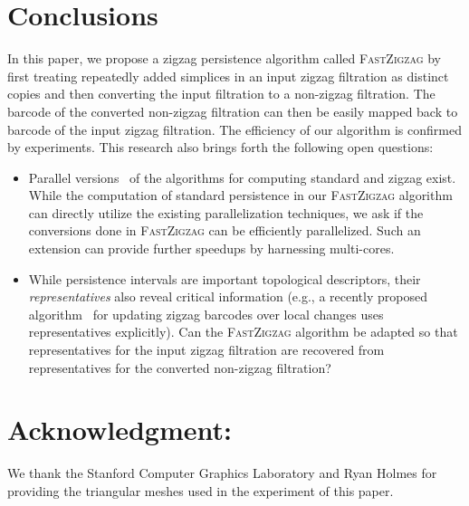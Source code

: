 \documentclass[letterpaper,11pt]{article}
\theoremstyle{mythmstyle}
\theoremstyle{mydefstyle}
\theoremstyle{plain}
\theoremstyle{definition}
\newcommand{\<}[1]{\langle #1\rangle}
\begin{document}
\section{Conclusions}

In this paper, we propose a zigzag persistence algorithm 
called \textsc{FastZigzag}
by first treating repeatedly added simplices in an input zigzag filtration
as distinct copies and then converting the input filtration
to a non-zigzag filtration.
The barcode of the converted non-zigzag filtration can then be
easily mapped back to barcode of the input zigzag filtration. 
The efficiency of our algorithm is confirmed by experiments.
This research also brings forth the following open questions:
\begin{itemize}
    \item Parallel versions~\cite{carlsson2019persistent,zhang2020gpu} of the algorithms for computing 
    standard and zigzag exist.
    While the computation of standard persistence in our \textsc{FastZigzag} algorithm 
    can directly utilize the existing parallelization techniques, we ask
    if the conversions done in \textsc{FastZigzag} can be efficiently parallelized.
    Such an extension can provide further speedups by harnessing multi-cores.
    
    \item While persistence intervals are important topological descriptors,
    their \emph{representatives} also reveal critical information
    (e.g., a recently proposed algorithm~\cite{dey2021updating} for updating
    zigzag barcodes over local changes uses
    representatives explicitly).
    Can the \textsc{FastZigzag} algorithm be adapted so that representatives
    for the input zigzag filtration are recovered from representatives 
    for the converted non-zigzag filtration?
\end{itemize}

\section*{Acknowledgment:}
We thank the Stanford Computer Graphics Laboratory
and Ryan Holmes
for providing the triangular meshes used in the experiment
of this paper.





\appendix
\end{document}
